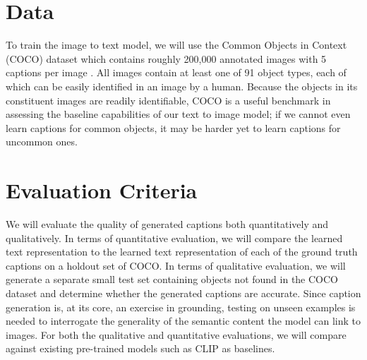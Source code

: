 \documentclass{article}
\begin{document}
\section{Data}
To train the image to text model, we will use the Common Objects in Context (COCO) dataset which contains roughly 200,000 annotated images with 5 captions per image \cite{DBLP:journals/corr/LinMBHPRDZ14}. All images contain at least one of 91 object types, each of which can be easily identified in an image by a human. Because the objects in its constituent images are readily identifiable, COCO is a useful benchmark in assessing the baseline capabilities of our text to image model; if we cannot even learn captions for common objects, it may be harder yet to learn captions for uncommon ones. \\

\section{Evaluation Criteria}
We will evaluate the quality of generated captions both quantitatively and qualitatively. In terms of quantitative evaluation, we will compare the learned text representation to the learned text representation of each of the ground truth captions on a holdout set of COCO. In terms of qualitative evaluation, we will generate a separate small test set containing objects not found in the COCO dataset and determine whether the generated captions are accurate. Since caption generation is, at its core, an exercise in grounding, testing on unseen examples is needed to interrogate the generality of the semantic content the model can link to images. For both the qualitative and quantitative evaluations, we will compare against existing pre-trained models such as CLIP as baselines. 


{\footnotesize
}
\end{document}
